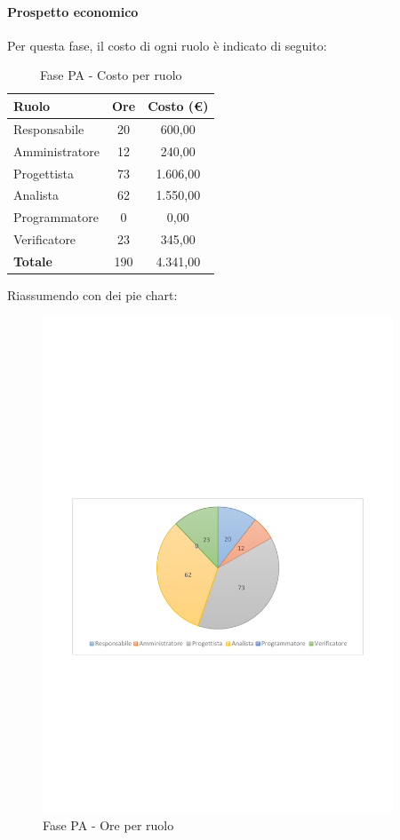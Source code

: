 \documentclass[../PianoProgetto.tex]{subfiles}
\begin{document}
	\paragraph{Prospetto economico}
					Per questa fase\g, il costo di ogni ruolo è indicato di seguito:
	\begin{table}[h]
		\centering
	
		\begin{tabular}{l * {2}{c}}
			\toprule
			\textbf{Ruolo} & \textbf{Ore} & \textbf{Costo (\euro{})} \\
			\midrule
			Responsabile &	20 & 600,00 \\
			Amministratore & 12 & 240,00 \\
			Progettista & 73 & 1.606,00 \\
			Analista & 62 & 1.550,00 \\
			Programmatore & 0 & 0,00 \\
			Verificatore & 23 & 345,00 \\
			\midrule		
			\textbf{Totale} & 190 & 4.341,00 \\
			\bottomrule
		\end{tabular}
		\caption{Fase PA - Costo per ruolo}
		\label{tab:fasePA_costo}
	\end{table}
\vfill	
	Riassumendo con dei pie chart:
	\begin{figure}[!h]
		\centering
		\includegraphics[width=0.93\textwidth , trim=2cm 9.5cm 2cm 11cm]{grafici/PA/PA-ore-ruolo}
			\caption{Fase PA - Ore per ruolo}
		\label{fig:CircleChart-fasePA_ore_r}
	\end{figure}
\end{document}
